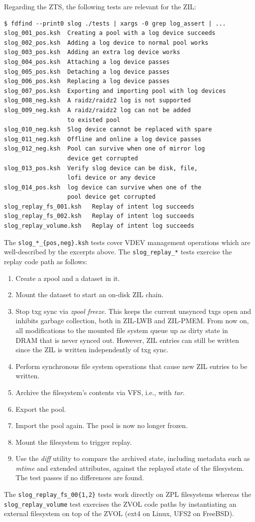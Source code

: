 \documentclass[12pt,a4paper,twoside]{book}
\begin{document}
Regarding the ZTS, the following tests are relevant for the ZIL:
\begin{lstlisting}[style=figurepseudocode]
$ fdfind --print0 slog ./tests | xargs -0 grep log_assert | ...
slog_001_pos.ksh  Creating a pool with a log device succeeds
slog_002_pos.ksh  Adding a log device to normal pool works
slog_003_pos.ksh  Adding an extra log device works
slog_004_pos.ksh  Attaching a log device passes
slog_005_pos.ksh  Detaching a log device passes
slog_006_pos.ksh  Replacing a log device passes
slog_007_pos.ksh  Exporting and importing pool with log devices
slog_008_neg.ksh  A raidz/raidz2 log is not supported
slog_009_neg.ksh  A raidz/raidz2 log can not be added
                  to existed pool
slog_010_neg.ksh  Slog device cannot be replaced with spare
slog_011_neg.ksh  Offline and online a log device passes
slog_012_neg.ksh  Pool can survive when one of mirror log
                  device get corrupted
slog_013_pos.ksh  Verify slog device can be disk, file,
                  lofi device or any device
slog_014_pos.ksh  log device can survive when one of the
                  pool device get corrupted
slog_replay_fs_001.ksh   Replay of intent log succeeds
slog_replay_fs_002.ksh   Replay of intent log succeeds
slog_replay_volume.ksh   Replay of intent log succeeds
\end{lstlisting}
The \lstinline|slog_*_{pos,neg}.ksh| tests cover VDEV management operations which are well-described by the excerpts above.
The \lstinline{slog_replay_*} tests exercise the replay code path as follows:
\begin{enumerate}[noitemsep]
    \item Create a zpool and a dataset in it.
    \item Mount the dataset to start an on-disk ZIL chain.
    \item Stop txg sync via \textit{zpool freeze}.
        This keeps the current unsynced txgs open and inhibits garbage collection, both in ZIL-LWB and ZIL-PMEM.
        From now on, all modifications to the mounted file system queue up as dirty state in DRAM that is never synced out.
        However, ZIL entries can still be written since the ZIL is written independently of txg sync.
    \item Perform synchronous file system operations that cause new ZIL entries to be written.
    \item Archive the filesystem's contents via VFS, i.e., with \textit{tar}.
    \item Export the pool.
    \item Import the pool again. The pool is now no longer frozen.
    \item Mount the filesystem to trigger replay.
    \item Use the \textit{diff} utility to compare the archived state, including metadata such as \textit{mtime} and extended attributes, against the replayed state of the filesystem.
        The test passes if no differences are found.
\end{enumerate}
The \lstinline|slog_replay_fs_00{1,2}| tests work directly on ZPL filesystems whereas the \lstinline|slog_replay_volume| test exercises the ZVOL code paths by instantiating an external filesystem on top of the ZVOL (ext4 on Linux, UFS2 on FreeBSD).
\end{document}
